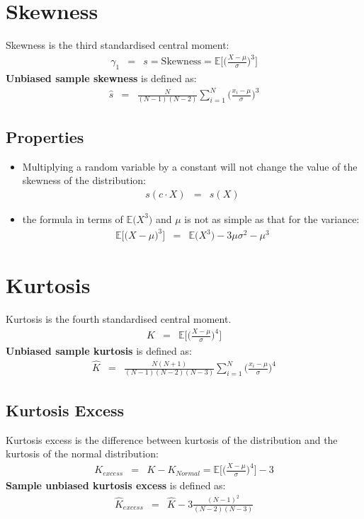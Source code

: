 \section{Skewness}
Skewness is the third standardised central moment:
\begin{eqnarray}
	\gamma_{1} &=& s = \text{Skewness} = \mathbb{E}\Bigg[\bigg(\frac{X - \mu}{\sigma}\bigg)^{3}\Bigg]
\end{eqnarray}
\textbf{\color{blue}Unbiased sample skewness} is defined as:
\begin{eqnarray}
	\hat{s} &=& \frac{N}{(N - 1)(N - 2)}\sum_{i = 1}^{N}\Bigg(\frac{x_{i} - \mu}{\sigma}\Bigg)^{3}
\end{eqnarray}

\subsection{Properties}
\begin{itemize}
	\item Multiplying a random variable by a constant will not change the value of the skewness of the distribution:
	\begin{eqnarray}
	s(c \cdot X) &=& s(X)
	\end{eqnarray}
	\item the formula in terms of $\mathbb{E}\Big(X^{3}\Big)$ and $\mu$ is not as simple as that for the variance:
	\begin{eqnarray}
		\mathbb{E}\Bigg[\bigg(X - \mu\bigg)^{3}\Bigg] &=& \mathbb{E}\Big(X^{3}\Big) - 3\mu\sigma^{2} - \mu^{3}
	\end{eqnarray}
\end{itemize}

\section{Kurtosis}
Kurtosis is the fourth standardised central moment.
\begin{eqnarray}
K &=& \mathbb{E}\Bigg[\bigg(\frac{X - \mu}{\sigma}\bigg)^{4}\Bigg]
\end{eqnarray}
\textbf{\color{blue}Unbiased sample kurtosis} is defined as:
\begin{eqnarray}
	\hat{K} &=& \frac{N(N + 1)}{(N - 1)(N - 2)(N - 3)}\sum_{i = 1}^{N}\Big(\frac{x_{i} - \mu}{\sigma}\Big)^{4}
\end{eqnarray}

\subsection{Kurtosis Excess}	
Kurtosis excess is the difference between kurtosis of the distribution and the kurtosis of the normal distribution:
\begin{eqnarray}
K_{excess} &=& K - K_{Normal} =  \mathbb{E}\Bigg[\bigg(\frac{X - \mu}{\sigma}\bigg)^{4}\Bigg] - 3
\end{eqnarray}
\textbf{\color{blue}Sample unbiased kurtosis excess} is defined as:
\begin{eqnarray}
	\hat{K}_{excess} &=& \hat{K} - 3\frac{(N - 1)^{2}}{(N - 2)(N - 3)}
\end{eqnarray}

